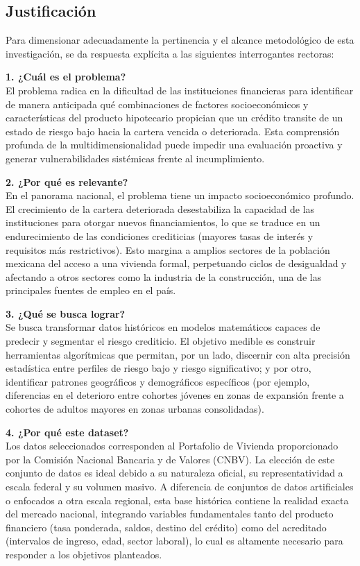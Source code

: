 \subsection{Justificación}
Para dimensionar adecuadamente la pertinencia y el alcance metodológico de esta investigación, se da respuesta explícita a las siguientes interrogantes rectoras:

\textbf{1. ¿Cuál es el problema?} \\
El problema radica en la dificultad de las instituciones financieras para identificar de manera anticipada qué combinaciones de factores socioeconómicos y características del producto hipotecario propician que un crédito transite de un estado de riesgo bajo hacia la cartera vencida o deteriorada. Esta comprensión profunda de la multidimensionalidad puede impedir una evaluación proactiva y generar vulnerabilidades sistémicas frente al incumplimiento.

\textbf{2. ¿Por qué es relevante?} \\
En el panorama nacional, el problema tiene un impacto socioeconómico profundo. El crecimiento de la cartera deteriorada desestabiliza la capacidad de las instituciones para otorgar nuevos financiamientos, lo que se traduce en un endurecimiento de las condiciones crediticias (mayores tasas de interés y requisitos más restrictivos). Esto margina a amplios sectores de la población mexicana del acceso a una vivienda formal, perpetuando ciclos de desigualdad y afectando a otros sectores como la industria de la construcción, una de las principales fuentes de empleo en el país.

\textbf{3. ¿Qué se busca lograr?} \\
Se busca transformar datos históricos en modelos matemáticos capaces de predecir y segmentar el riesgo crediticio. El objetivo medible es construir herramientas algorítmicas que permitan, por un lado, discernir con alta precisión estadística entre perfiles de riesgo bajo y riesgo significativo; y por otro, identificar patrones geográficos y demográficos específicos (por ejemplo, diferencias en el deterioro entre cohortes jóvenes en zonas de expansión frente a cohortes de adultos mayores en zonas urbanas consolidadas).

\textbf{4. ¿Por qué este dataset?} \\
Los datos seleccionados corresponden al Portafolio de Vivienda proporcionado por la Comisión Nacional Bancaria y de Valores (CNBV). La elección de este conjunto de datos es ideal debido a su naturaleza oficial, su representatividad a escala federal y su volumen masivo. A diferencia de conjuntos de datos artificiales o enfocados a otra escala regional, esta base histórica contiene la realidad exacta del mercado nacional, integrando variables fundamentales tanto del producto financiero (tasa ponderada, saldos, destino del crédito) como del acreditado (intervalos de ingreso, edad, sector laboral), lo cual es altamente necesario para responder a los objetivos planteados.

